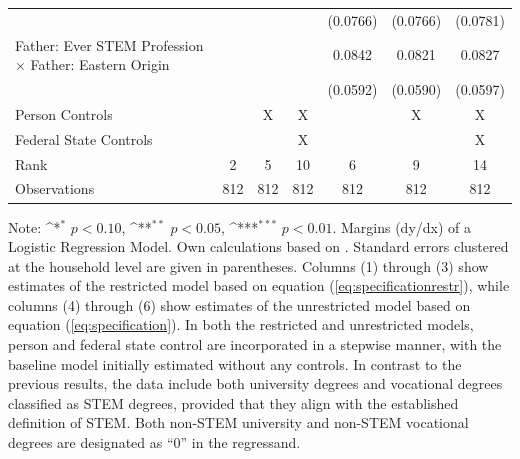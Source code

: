 \documentclass[a4paper, oneside, hyperfootnotes = false]{article}
\def\sym#1{\ifmmode^{#1}\else\(^{#1}\)\fi}
\begin{document}
{\begin{landscape}
\begin{table}[ht]
\begin{center}
{\begin{tabular}{l*{6}{c}}
					&                     &                     &                     &    (0.0766)         &    (0.0766)         &    (0.0781)         \\
					\addlinespace
					Father: Ever STEM Profession $\times$ Father: Eastern Origin&                     &                     &                     &      0.0842         &      0.0821         &      0.0827         \\
					&                     &                     &                     &    (0.0592)         &    (0.0590)         &    (0.0597)         \\
					\midrule
					Person Controls & & X  & X & & X & X \\
					Federal State Controls & & & X & & & X \\
					Rank                &      2         &      5         &     10         &      6         &      9         &     14         \\
					Observations &    812         &    812         &    812         &    812         &    812         &   812         \\
					\bottomrule
			\end{tabular}}
			
			\vspace{2mm}
			
			\parbox{15cm}{
				\linespread{1}\footnotesize Note: \sym{*} \(p<0.10\), \sym{**} \(p<0.05\), \sym{***} \(p<0.01\). Margins (dy/dx) of a Logistic Regression Model. Own calculations based on \cite{SOEP2023}. Standard errors clustered at the household level are given in parentheses. Columns (1) through (3) show estimates of the restricted model based on equation (\ref{eq:specificationrestr}), while columns (4) through (6) show estimates of the unrestricted model based on equation (\ref{eq:specification}). In both the restricted and unrestricted models, person and federal state control are incorporated in a stepwise manner, with the baseline model initially estimated without any controls. In contrast to the previous results, the data include both university degrees and vocational degrees classified as STEM degrees, provided that they align with the established definition of STEM. Both non-STEM university and non-STEM vocational degrees are designated as ``0'' in the regressand.}
			
		\end{center}
	\end{table}
\end{landscape}

\clearpage

}
\end{document}
